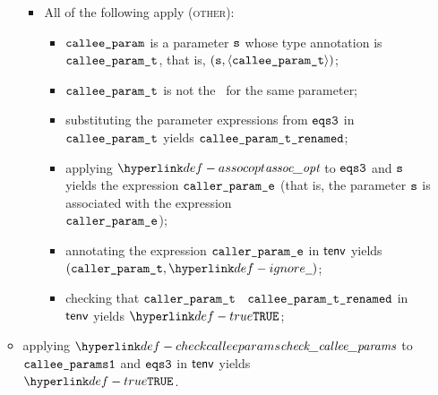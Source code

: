 \begin{itemize}
\begin{itemize}
\begin{itemize}
      \item All of the following apply (\textsc{other}):
      \begin{itemize}
        \item $\texttt{callee\_param}$ is a parameter $\texttt{s}$ whose type annotation is \\
              $\texttt{callee\_param\_t}$, that is, $(\texttt{s}, \langle\texttt{callee\_param\_t}\rangle)$;
        \item $\texttt{callee\_param\_t}$ is not the \parameterizedintegertype\ for the same parameter;
        \item substituting the parameter expressions from $\texttt{eqs3}$ in $\texttt{callee\_param\_t}$
              yields $\texttt{callee\_param\_t\_renamed}$\ProseOrTypeError;
        \item applying $\assocopt$ to $\texttt{eqs3}$ and $\texttt{s}$ yields the expression $\texttt{caller\_param\_e}$
              (that is, the parameter $\texttt{s}$ is associated with the expression \\
              $\texttt{caller\_param\_e}$);
        \item annotating the expression $\texttt{caller\_param\_e}$ in $\textsf{tenv}$ yields \\
              $(\callerparamt, \Ignore)$\ProseOrTypeError;
        \item checking that $\texttt{caller\_param\_t}$ \typesatisfies\ $\texttt{callee\_param\_t\_renamed}$ in $\textsf{tenv}$ yields
              $\True$\ProseOrTypeError;
      \end{itemize}
    \end{itemize}
    \item applying $\checkcalleeparams$ to $\texttt{callee\_params1}$ and $\texttt{eqs3}$ in $\textsf{tenv}$
          yields \\ $\True$\ProseOrTypeError.
  \end{itemize}
\end{itemize}

